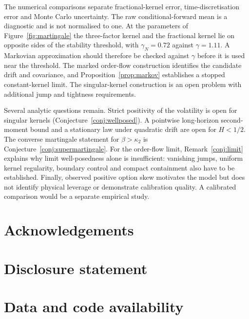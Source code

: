 The numerical comparisons separate fractional-kernel error, time-discretisation error and Monte Carlo uncertainty. The raw conditional-forward mean is a diagnostic and is not normalised to one. At the parameters of Figure~\ref{fig:martingale} the three-factor kernel and the fractional kernel lie on opposite sides of the stability threshold, with $\gamma_N=0.72$ against $\gamma=1.11$. A Markovian approximation should therefore be checked against $\gamma$ before it is used near the threshold. The marked order-flow construction identifies the candidate drift and covariance, and Proposition~\ref{prop:markov} establishes a stopped constant-kernel limit. The singular-kernel construction is an open problem with additional jump and tightness requirements.

Several analytic questions remain. Strict positivity of the volatility is open for singular kernels (Conjecture~\ref{conj:wellposed}). A pointwise long-horizon second-moment bound and a stationary law under quadratic drift are open for $H<1/2$. The converse martingale statement for $\beta>\kappa_2$ is Conjecture~\ref{conj:supermartingale}. For the order-flow limit, Remark~\ref{conj:limit} explains why limit well-posedness alone is insufficient: vanishing jumps, uniform kernel regularity, boundary control and compact containment also have to be established. Finally, observed positive option skew motivates the model but does not identify physical leverage or demonstrate calibration quality. A calibrated comparison would be a separate empirical study.


\section*{Acknowledgements}

\section*{Disclosure statement}

\section*{Data and code availability}

